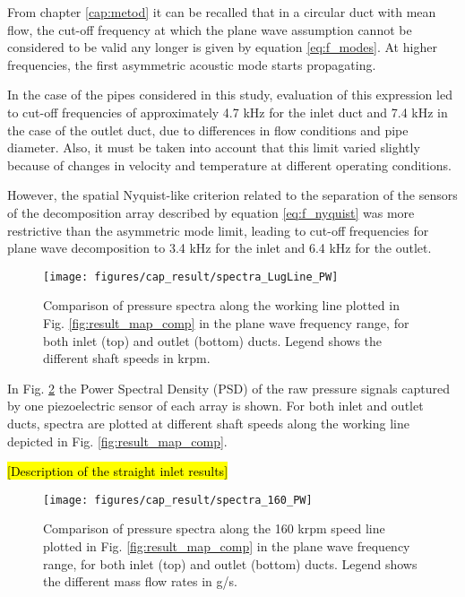 From chapter \ref{cap:metod} it can be recalled that in a circular duct with mean flow, the cut-off frequency at which the plane wave assumption cannot be considered to be valid any longer is given by equation \ref{eq:f_modes}. At higher frequencies, the first asymmetric acoustic mode starts propagating.

In the case of the pipes considered in this study, evaluation of this expression led to cut-off frequencies of approximately 4.7 kHz for the inlet duct and 7.4 kHz in the case of the outlet duct, due to differences in flow conditions and pipe diameter. Also, it must be taken into account that this limit varied slightly because of changes in velocity and temperature at different operating conditions.

However, the spatial Nyquist-like criterion related to the separation of the sensors of the decomposition array described by equation \ref{eq:f_nyquist} was more restrictive than the asymmetric mode limit, leading to cut-off frequencies for plane wave decomposition to 3.4 kHz for the inlet and 6.4 kHz for the outlet.

\begin{figure}[tbh!]
\centering
\texttt{[image: figures/cap\_result/spectra\_LugLine\_PW]}
\caption{Comparison of pressure spectra along the working line plotted in Fig. \ref{fig:result_map_comp} in the plane wave frequency range, for both inlet (top) and outlet (bottom) ducts. Legend shows the different shaft speeds in krpm.}
\label{fig:result_spectra_LugLine_PW}
\end{figure}

In Fig. \ref{fig:result_spectra_LugLine_PW} the Power Spectral Density (PSD) of the raw pressure signals captured by one piezoelectric sensor of each array is shown. For both inlet and outlet ducts, spectra are plotted at different shaft speeds along the working line depicted in Fig. \ref{fig:result_map_comp}.

\hl{[Description of the straight inlet results]}

\begin{figure}[tbh!]
\centering
\texttt{[image: figures/cap\_result/spectra\_160\_PW]}
\caption{Comparison of pressure spectra along the 160 krpm speed line plotted in Fig. \ref{fig:result_map_comp} in the plane wave frequency range, for both inlet (top) and outlet (bottom) ducts. Legend shows the different mass flow rates in g/s.}
\label{fig:result_spectra_LugLine_PW}
\end{figure}

